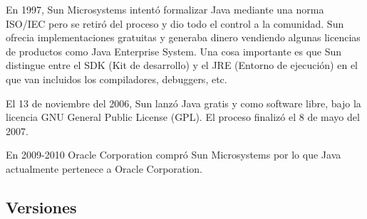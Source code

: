 En 1997, Sun Microsystems intentó formalizar Java mediante una norma ISO/IEC pero se retiró del proceso y dio todo el control a la comunidad. Sun ofrecia implementaciones gratuitas y generaba dinero vendiendo algunas licencias de productos como Java Enterprise System. Una cosa importante es que Sun distingue entre el SDK (Kit de desarrollo) y el JRE (Entorno de ejecución) en el que van incluidos los compiladores, debuggers, etc.

El 13 de noviembre del 2006, Sun lanzó Java gratis y como software libre, bajo la licencia GNU General Public License (GPL). El proceso finalizó el 8 de mayo del 2007.

En 2009-2010 Oracle Corporation compró Sun Microsystems por lo que Java actualmente pertenece a Oracle Corporation.

\subsection{Versiones}

